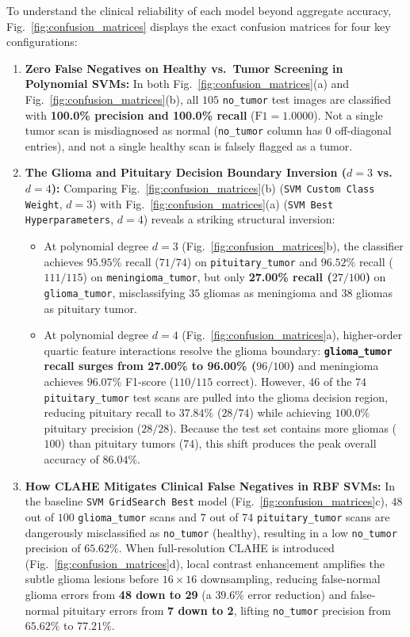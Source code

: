\documentclass[conference]{IEEEtran}
\begin{document}
To understand the clinical reliability of each model beyond aggregate accuracy, Fig.~\ref{fig:confusion_matrices} displays the exact confusion matrices for four key configurations:
\begin{enumerate}
    \item \textbf{Zero False Negatives on Healthy vs.\ Tumor Screening in Polynomial SVMs:} In both Fig.~\ref{fig:confusion_matrices}(a) and Fig.~\ref{fig:confusion_matrices}(b), all $105$ \texttt{no\_tumor} test images are classified with \textbf{100.0\% precision and 100.0\% recall} ($\text{F1} = 1.0000$). Not a single tumor scan is misdiagnosed as normal (\texttt{no\_tumor} column has $0$ off-diagonal entries), and not a single healthy scan is falsely flagged as a tumor.
    \item \textbf{The Glioma and Pituitary Decision Boundary Inversion ($d=3$ vs.\ $d=4$):} Comparing Fig.~\ref{fig:confusion_matrices}(b) (\texttt{SVM Custom Class Weight}, $d=3$) with Fig.~\ref{fig:confusion_matrices}(a) (\texttt{SVM Best Hyperparameters}, $d=4$) reveals a striking structural inversion:
    \begin{itemize}
        \item At polynomial degree $d=3$ (Fig.~\ref{fig:confusion_matrices}b), the classifier achieves $95.95\%$ recall ($71/74$) on \texttt{pituitary\_tumor} and $96.52\%$ recall ($111/115$) on \texttt{meningioma\_tumor}, but only \textbf{27.00\% recall ($27/100$)} on \texttt{glioma\_tumor}, misclassifying $35$ gliomas as meningioma and $38$ gliomas as pituitary tumor.
        \item At polynomial degree $d=4$ (Fig.~\ref{fig:confusion_matrices}a), higher-order quartic feature interactions resolve the glioma boundary: \textbf{\texttt{glioma\_tumor} recall surges from 27.00\% to 96.00\% ($96/100$)} and meningioma achieves $96.07\%$ F1-score ($110/115$ correct). However, $46$ of the $74$ \texttt{pituitary\_tumor} test scans are pulled into the glioma decision region, reducing pituitary recall to $37.84\%$ ($28/74$) while achieving $100.0\%$ pituitary precision ($28/28$). Because the test set contains more gliomas ($100$) than pituitary tumors ($74$), this shift produces the peak overall accuracy of $86.04\%$.
    \end{itemize}
    \item \textbf{How CLAHE Mitigates Clinical False Negatives in RBF SVMs:} In the baseline \texttt{SVM GridSearch Best} model (Fig.~\ref{fig:confusion_matrices}c), $48$ out of $100$ \texttt{glioma\_tumor} scans and $7$ out of $74$ \texttt{pituitary\_tumor} scans are dangerously misclassified as \texttt{no\_tumor} (healthy), resulting in a low \texttt{no\_tumor} precision of $65.62\%$. When full-resolution CLAHE is introduced (Fig.~\ref{fig:confusion_matrices}d), local contrast enhancement amplifies the subtle glioma lesions before $16 \times 16$ downsampling, reducing false-normal glioma errors from \textbf{48 down to 29} (a $39.6\%$ error reduction) and false-normal pituitary errors from \textbf{7 down to 2}, lifting \texttt{no\_tumor} precision from $65.62\%$ to $77.21\%$.
\end{enumerate}
\end{document}

